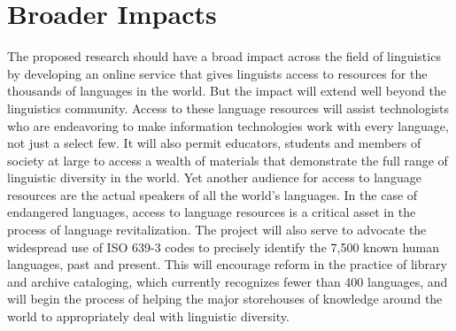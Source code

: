 \documentclass[11pt]{nsf}
\begin{document}
\section*{Broader Impacts}

The proposed research should have a broad impact across the field of
linguistics by developing an online service that gives linguists
access to resources for the thousands of languages in the world. But
the impact will extend well beyond the linguistics community. Access
to these language resources will assist technologists who are
endeavoring to make information technologies work with every language,
not just a select few.  It will also permit educators, students and
members of society at large to access a wealth of materials that
demonstrate the full range of linguistic diversity in the world.  Yet
another audience for access to language resources are the actual
speakers of all the world's languages.  In the case of endangered
languages, access to language resources is a critical asset in the
process of language revitalization.  The project will also serve to
advocate the widespread use of ISO 639-3 codes to precisely identify
the 7,500 known human languages, past and present.  This will
encourage reform in the practice of library and archive cataloging,
which currently recognizes fewer than 400 languages, and will begin
the process of helping the major storehouses of knowledge around the
world to appropriately deal with linguistic diversity.
\end{document}
